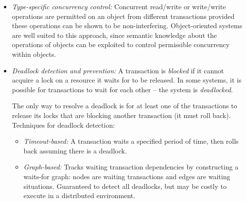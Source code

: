 \begin{itemize}
  \item \textit{Type-specific concurrency control:} Concurrent read/write or write/write operations are permitted on an object from different transactions provided these operations can be shown to be non-interfering. Object-oriented systems are well suited to this approach, since semantic knowledge about the operations of objects can be exploited to control permissible concurrency within objects.

  \item \textit{Deadlock detection and prevention:} A transaction is \textit{blocked} if it cannot acquire a lock on a resource it waits for to be released. In some systems, it is possible for transactions to wait for each other -- the system is \textit{deadlocked}.

  The only way to resolve a deadlock is for at least one of the transactions to release its locks that are blocking another transaction (it must roll back). Techniques for deadlock detection:
  \begin{itemize}[nolistsep,noitemsep]
    \item \textit{Timeout-based:} A transaction waits a specified period of time, then rolls back assuming there is a deadlock.
    \item \textit{Graph-based:} Tracks waiting transaction dependencies by constructing a waits-for graph: nodes are waiting transactions and edges are waiting situations. Guaranteed to detect all deadlocks, but may be costly to execute in a distributed environment.
  \end{itemize}
\end{itemize}

